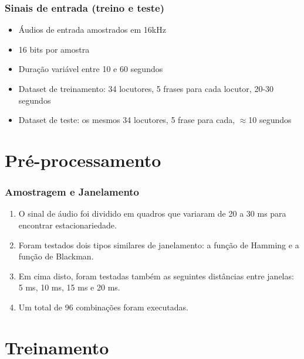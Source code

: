 \documentclass{beamer}
\begin{document}
\begin{frame} %
    \frametitle{Sinais de entrada (treino e teste)}

    \begin{itemize}
        \item Áudios de entrada amostrados em 16kHz 
        \medskip
        \item 16 bits por amostra
        \medskip
        \item Duração variável entre 10 e 60 segundos
        \medskip
        \item Dataset de treinamento: 34 locutores, 5 frases para cada locutor, 20-30 segundos
        \medskip
        \item Dataset de teste: os mesmos 34 locutores, 5 frase para cada, $\approx$10 segundos
    \end{itemize}
\end{frame}


\section{Pré-processamento}

\begin{frame} %
    \frametitle{Amostragem e Janelamento}

    \begin{enumerate}
        \item O sinal de áudio foi dividido em quadros que variaram de 20 a 30 ms para encontrar estacionariedade.
        \bigskip
        \item Foram testados dois tipos similares de janelamento: a função de Hamming e a função de Blackman.
        \bigskip
        \item Em cima disto, foram testadas também as seguintes distâncias entre janelas: 5 ms, 10 ms, 15 ms e 20 ms. 
        \bigskip
        \item Um total de 96 combinações foram executadas.
    \end{enumerate}
   

\end{frame}


\section{Treinamento}
\end{document}
